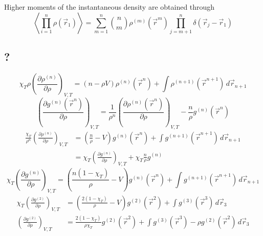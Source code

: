 Higher moments of the instantaneous density are obtained through
\begin{equation}
  \left\langle \prod_{i=1}^n \rho(\vec{r}_1) \right\rangle
  =
  \sum_{m=1}^n {n \choose m}
  \rho^{(m)}(\vec{r}^m)
  \prod_{j=m+1}^n \delta(\vec{r}_j - \vec{r}_1)
\end{equation}

\subsection{?}


\begin{equation}
  \chi_T \rho
  \left( \frac{\partial \rho^{(n)}}{\partial \rho} \right)_{V,T}
  =
  (n - \rho V) \rho^{(n)}(\vec{r}^n)
  + \int \rho^{(n+1)}(\vec{r}^{n+1}) \, d\vec{r}_{n+1}
\end{equation}
\begin{equation}
  \left( \frac{\partial g^{(n)}(\vec{r}^n)}{\partial \rho} \right)_{V,T}
  =
  \frac{1}{\rho^n}
  \left( \frac{\partial \rho^{(n)}(\vec{r}^n)}{\partial \rho} \right)_{V,T}
  - \frac{n}{\rho} g^{(n)}(\vec{r}^n)
\end{equation}
\begin{equation}
  \begin{split}
    \frac{\chi_T}{\rho^n}
    \left( \frac{\partial \rho^{(n)}}{\partial \rho} \right)_{V,T}
    &=
    \left(\frac{n}{\rho} - V\right) g^{(n)}(\vec{r}^n)
    + \int g^{(n+1)}(\vec{r}^{n+1}) \, d\vec{r}_{n+1}
    \\ &=
    \chi_T \left( \frac{\partial g^{(n)}}{\partial \rho} \right)_{V,T}
    + \chi_T \frac{n}{\rho} g^{(n)}
  \end{split}
\end{equation}
\begin{equation}
  \chi_T \left( \frac{\partial g^{(n)}}{\partial \rho} \right)_{V,T}
  =
  \left(
  \frac{n (1 - \chi_T)}{\rho}
  - V
  \right) g^{(n)}(\vec{r}^n)
  + \int g^{(n+1)}(\vec{r}^{n+1}) \, d\vec{r}_{n+1}
\end{equation}
\begin{equation}
  \begin{split}
    \chi_T \left( \frac{\partial g^{(2)}}{\partial \rho} \right)_{V,T}
    &=
    \left(
    \frac{2 (1 - \chi_T)}{\rho}
    - V
    \right) g^{(2)}(\vec{r}^2)
    + \int g^{(3)}(\vec{r}^3) \, d\vec{r}_3
    \\
    \left( \frac{\partial g^{(2)}}{\partial \rho} \right)_{V,T}
    &=
    \frac{2 (1 - \chi_T)}{\rho \chi_T}
    g^{(2)}(\vec{r}^2)
    +
    \int g^{(3)}(\vec{r}^3) - \rho g^{(2)}(\vec{r}^2) \, d\vec{r}_3
  \end{split}
\end{equation}


